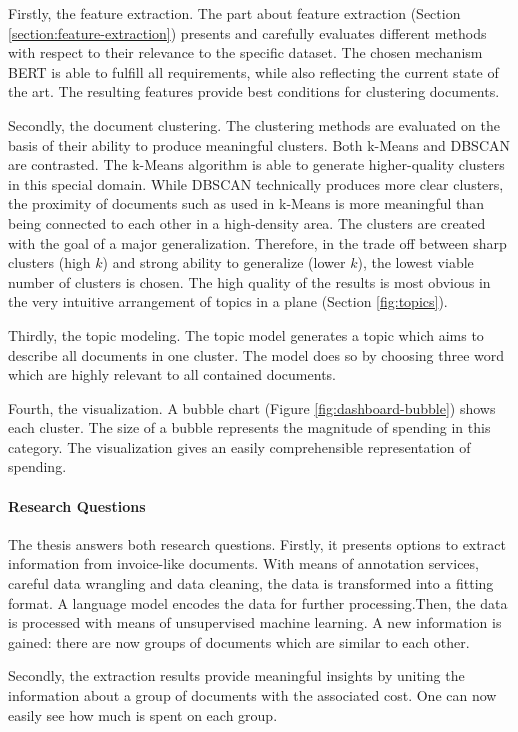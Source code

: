 Firstly, the feature extraction. The part about feature extraction (Section \ref{section:feature-extraction}) presents and carefully evaluates different methods with respect to their relevance to the specific dataset. The chosen mechanism \ac{BERT} is able to fulfill all requirements, while also reflecting the current state of the art. The resulting features provide best conditions for clustering documents.

Secondly, the document clustering.
The clustering methods are evaluated on the basis of their ability to produce meaningful clusters. 
Both k-Means and \ac{DBSCAN} are contrasted. 
The k-Means algorithm is able to generate higher-quality clusters in this special domain. While \ac{DBSCAN} technically produces more clear clusters, the proximity of documents such as used in k-Means is more meaningful than being connected to each other in a high-density area.
The clusters are created with the goal of a major generalization. Therefore, in the trade off between sharp clusters (high $k$) and strong ability to generalize (lower $k$), the lowest viable number of clusters is chosen. The high quality of the results is most obvious in the very intuitive arrangement of topics in a plane (Section \ref{fig:topics}).

Thirdly, the topic modeling.
The topic model generates a topic which aims to describe all documents in one cluster. The model does so by choosing three word which are highly relevant to all contained documents. 

Fourth, the visualization.
A bubble chart (Figure \ref{fig:dashboard-bubble}) shows each cluster. The size of a bubble represents the magnitude of spending in this category.
The visualization gives an easily comprehensible representation of spending. 

\paragraph{Research Questions}
The thesis answers both research questions. Firstly, it presents options to extract information from invoice-like documents. With means of annotation services, careful data wrangling and data cleaning, the data is transformed into a fitting format. A language model encodes the data for further processing.Then, the data is processed with means of unsupervised machine learning. A new information is gained: there are now groups of documents which are similar to each other.

Secondly, the extraction results provide meaningful insights by uniting the information about a group of documents with the associated cost. One can now easily see how much is spent on each group.